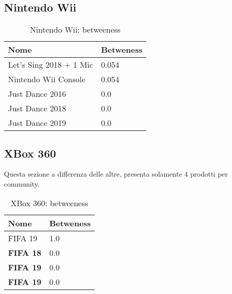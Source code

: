 			\subsection{Nintendo Wii}
				\begin{table}[H]
					\caption{Nintendo Wii: betweeness}
					\label{tab:wii}
					\centering
					\begin{tabular}{ll}
						\toprule 
						\textbf{Nome} & \textbf{Betweness} \\
						\midrule
						Let's Sing 2018 + 1 Mic & 0.054 \\
						Nintendo Wii Console & 0.054 \\
						Just Dance 2016 & 0.0 \\
						Just Dance 2018 & 0.0 \\
						Just Dance 2019 & 0.0 \\		
						\bottomrule
					\end{tabular}
				\end{table}
			
	\pagebreak
	
			\subsection{XBox 360}
				Questa sezione a differenza delle altre, presenta solamente 4 prodotti per community.
				\begin{table}[H]
					\caption{XBox 360: betweeness}
					\label{tab:xbox360}
					\centering
					\begin{tabular}{ll}
						\toprule 
						\textbf{Nome} & \textbf{Betweness} \\
						\midrule
						FIFA 19 & 1.0 \\
						\textbf{FIFA 18} & 0.0 \\
						\textbf{FIFA 19}  & 0.0 \\
						\textbf{FIFA 19} & 0.0 \\
						\bottomrule
					\end{tabular}
				\end{table}
			